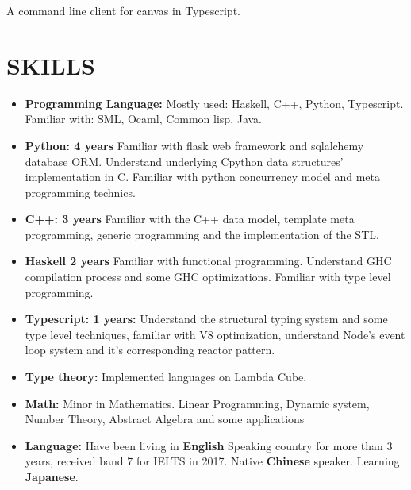\documentclass{res}
\begin{document}
\begin{resume}
\begin{tabbing}
    \end{tabbing}\vspace{-30pt}
    A command line client for canvas in Typescript.

\section{SKILLS}
    \begin{itemize}[leftmargin=-.2in]
        \setlength\itemsep{-1em}
        \item \textbf{Programming Language:} Mostly used: Haskell, C++, Python, Typescript. Familiar with: SML, Ocaml, Common lisp, Java. \\
        \item \textbf{Python: 4 years}
          Familiar with flask web framework and sqlalchemy database ORM.
          Understand underlying Cpython data structures' implementation in C.
          Familiar with python concurrency model and meta programming technics. \\
        \item \textbf{C++: 3 years}
          Familiar with the C++ data model, template meta programming,
          generic programming and the implementation of the STL. \\
        \item \textbf{Haskell 2 years}
          Familiar with functional programming.
          Understand GHC compilation process and some GHC optimizations.
          Familiar with type level programming.\\
        \item \textbf{Typescript: 1 years:} Understand the structural typing system and some type level techniques, familiar with V8 optimization, understand Node's event loop system and it's corresponding reactor pattern. \\
        \item \textbf{Type theory:} Implemented languages on Lambda Cube. \\
        \item \textbf{Math:} Minor in Mathematics. Linear Programming, Dynamic system, Number Theory, Abstract Algebra and some applications \\
        \item \textbf{Language:} Have been living in \textbf{English} Speaking country for more than 3 years, received band 7 for IELTS in 2017. Native \textbf{Chinese} speaker. Learning \textbf{Japanese}.
    \end{itemize}

\end{resume}
\end{document}
